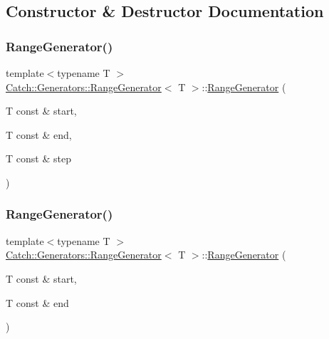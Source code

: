 \subsection{Constructor \& Destructor Documentation}
\mbox{\label{class_catch_1_1_generators_1_1_range_generator_a6a9b3cc009471c085c985642e0ab102e}} 
\subsubsection{\texorpdfstring{Range\+Generator()}{RangeGenerator()}\hspace{0.1cm}{\footnotesize\ttfamily [1/2]}}
{\footnotesize\ttfamily template$<$typename T $>$ \\
\mbox{\hyperlink{class_catch_1_1_generators_1_1_range_generator}{Catch\+::\+Generators\+::\+Range\+Generator}}$<$ T $>$\+::\mbox{\hyperlink{class_catch_1_1_generators_1_1_range_generator}{Range\+Generator}} (\begin{DoxyParamCaption}\item[{T const \&}]{start,  }\item[{T const \&}]{end,  }\item[{T const \&}]{step }\end{DoxyParamCaption})\hspace{0.3cm}{\ttfamily [inline]}}

\mbox{\label{class_catch_1_1_generators_1_1_range_generator_ac999eb143945ff311b97d2c767df90d3}} 
\subsubsection{\texorpdfstring{Range\+Generator()}{RangeGenerator()}\hspace{0.1cm}{\footnotesize\ttfamily [2/2]}}
{\footnotesize\ttfamily template$<$typename T $>$ \\
\mbox{\hyperlink{class_catch_1_1_generators_1_1_range_generator}{Catch\+::\+Generators\+::\+Range\+Generator}}$<$ T $>$\+::\mbox{\hyperlink{class_catch_1_1_generators_1_1_range_generator}{Range\+Generator}} (\begin{DoxyParamCaption}\item[{T const \&}]{start,  }\item[{T const \&}]{end }\end{DoxyParamCaption})\hspace{0.3cm}{\ttfamily [inline]}}



